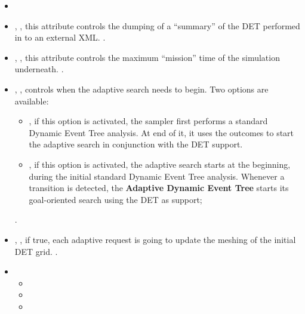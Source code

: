 %
\attrIntro

\begin{itemize}
  \itemsep0em
  \item \nameDescription
  \item {}, ,
    this attribute controls the dumping of a ``summary'' of the DET performed in
    to an external XML.
    .
  \item {}, , this
    attribute controls the maximum ``mission'' time of the simulation
    underneath.
    .
  \item {}, , controls when the
    adaptive search needs to begin.
    Two options are available:
    \begin{itemize}
       \item {}, if this option is activated, the sampler first
         performs a standard Dynamic Event Tree analysis. At end of it, it uses
         the outcomes to start the adaptive search in conjunction with the DET
         support.
       \item {}, if this option is activated, the adaptive
         search starts at the beginning, during the initial standard Dynamic
         Event Tree analysis.
         Whenever a transition is detected, the
         \textbf{Adaptive Dynamic Event Tree} starts its goal-oriented search
         using the DET as support;
    \end{itemize}
      .
  \item {}, , if true,
    each adaptive request is going to update the meshing of the initial DET
    grid.
    .
\end{itemize}
\begin{itemize}
\item \variableDescription
  \variableChildrenIntro
 \begin{itemize}
    \item \distributionDescription
    \item \functionDescription
    \item \gridDescription
  \end{itemize}
\end{itemize}

